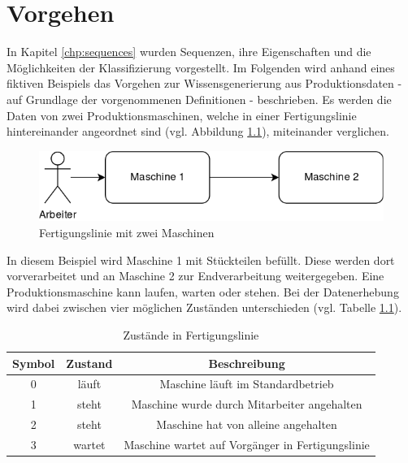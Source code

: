 \chapter{Vorgehen}
\label{chp:procedure}
In Kapitel \ref{chp:sequences} wurden Sequenzen, ihre Eigenschaften und die Möglichkeiten der Klassifizierung vorgestellt. Im Folgenden wird anhand eines fiktiven Beispiels das Vorgehen zur Wissensgenerierung aus Produktionsdaten - auf Grundlage der vorgenommenen Definitionen - beschrieben. Es werden die Daten von zwei Produktionsmaschinen, welche in einer Fertigungslinie hintereinander angeordnet sind (vgl. Abbildung \ref{fig:production-line}), miteinander verglichen.

\begin{figure}[H]
	\centering
	\includegraphics[scale=0.40]{images/Vorgehen/fertigungslinie}
	\caption{Fertigungslinie mit zwei Maschinen}
	\label{fig:production-line}
\end{figure}

In diesem Beispiel wird Maschine 1 mit Stückteilen befüllt. Diese werden dort vorverarbeitet und an Maschine 2 zur Endverarbeitung weitergegeben. Eine Produktionsmaschine kann laufen, warten oder stehen. Bei der Datenerhebung wird dabei zwischen vier möglichen Zuständen unterschieden (vgl. Tabelle \ref{tab:status-in-production}). 

\begin{table}
	\begin{center}
		\begin{tabular}{|c c c|} 
			\hline
			Symbol & Zustand & Beschreibung \\
			\hline\hline
			0 & läuft & Maschine läuft im Standardbetrieb \\ 
			\hline
			1 & steht & Maschine wurde durch Mitarbeiter angehalten \\
			\hline
			2 & steht & Maschine hat von alleine angehalten \\
			\hline
			3 & wartet & Maschine wartet auf Vorgänger in Fertigungslinie \\
			\hline
		\end{tabular}
		\caption{Zustände in Fertigungslinie}
		\label{tab:status-in-production}
	\end{center}
\end{table}

